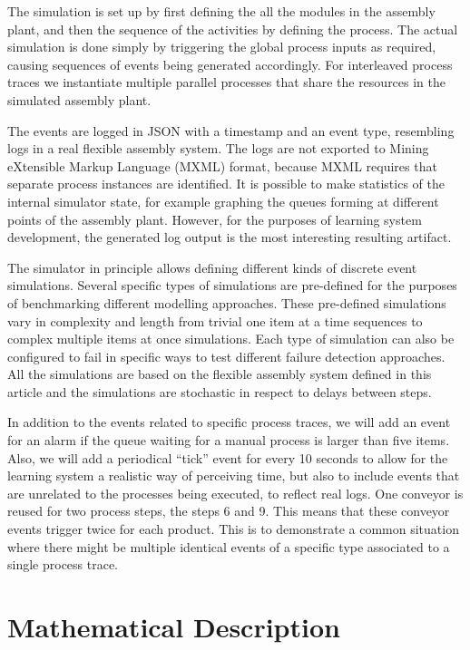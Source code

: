 \documentclass[journal]{IEEEtran}
\begin{document}
The simulation is set up by first defining the all the modules in the assembly plant, and then the sequence of the activities by defining the process. The actual simulation
is done simply by triggering the global process inputs as required, causing sequences of events being generated accordingly. For interleaved process traces we instantiate multiple
parallel processes that share the resources in the simulated assembly plant.

The events are logged in JSON with a timestamp and an event type, resembling logs in a real flexible assembly system. The logs are not exported to
Mining eXtensible Markup Language (MXML) format, because MXML requires that separate process instances are identified. It is possible to make statistics of the internal simulator
state, for example graphing the queues forming at different points of the assembly plant. However, for the purposes of learning system development, the generated log output is the most
interesting resulting artifact.

The simulator in principle allows defining different kinds of discrete event simulations. Several specific types of simulations are pre-defined for the purposes of benchmarking
different modelling approaches. These pre-defined simulations vary in complexity and length from trivial one item at a time sequences to complex multiple items at once simulations.
Each type of simulation can also be configured to fail in specific ways to test different failure detection approaches. All the simulations are based on the flexible assembly system
defined in this article and the simulations are stochastic in respect to delays between steps.

In addition to the events related to specific process traces, we will add an event for an alarm if the queue waiting for a manual process is larger than five items. Also, we will
add a periodical ``tick'' event for every 10 seconds to allow for the learning system a realistic way of perceiving time, but also to include events that are unrelated to
the processes being executed, to reflect real logs. One conveyor is reused for two process steps, the steps 6 and 9. This means that these conveyor events
trigger twice for each product. This is to demonstrate a common situation where there might be multiple identical events of a specific type
associated to a single process trace.

\section{Mathematical Description}
\end{document}
